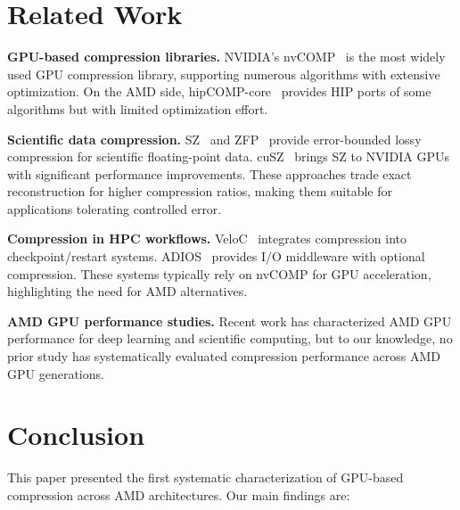 \documentclass[runningheads]{llncs}
\begin{document}
%



\section{Related Work}
\label{sec:related}

\textbf{GPU-based compression libraries.} NVIDIA's nvCOMP~\cite{nvcomp} is the most widely used GPU compression library, supporting numerous algorithms with extensive optimization. On the AMD side, hipCOMP-core~\cite{hipcomp-core} provides HIP ports of some algorithms but with limited optimization effort.

\textbf{Scientific data compression.} SZ~\cite{sz} and ZFP~\cite{zfp} provide error-bounded lossy compression for scientific floating-point data. cuSZ~\cite{cusz} brings SZ to NVIDIA GPUs with significant performance improvements. These approaches trade exact reconstruction for higher compression ratios, making them suitable for applications tolerating controlled error.

\textbf{Compression in HPC workflows.} VeloC~\cite{veloc} integrates compression into checkpoint/restart systems. ADIOS~\cite{adios} provides I/O middleware with optional compression. These systems typically rely on nvCOMP for GPU acceleration, highlighting the need for AMD alternatives.

\textbf{AMD GPU performance studies.} Recent work has characterized AMD GPU performance for deep learning and scientific computing, but to our knowledge, no prior study has systematically evaluated compression performance across AMD GPU generations.



%


\section{Conclusion}
\label{sec:conclusion}

This paper presented the first systematic characterization of GPU-based compression across AMD architectures. Our main findings are:
\end{document}
